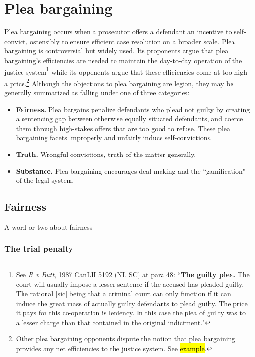 \section{Plea bargaining}

Plea bargaining occurs when a prosecutor offers a defendant an incentive to self-convict, ostensibly to ensure efficient case resolution on a broader scale. Plea bargaining is controversial but widely used. Its proponents argue that plea bargaining's efficiencies are needed to maintain the day-to-day operation of the justice system\footnote{See \textit{R v Butt}, 1987 CanLII 5192 (NL SC) at para 48: ``\textbf{The guilty plea.} The court will usually impose a lesser sentence if the accused has pleaded guilty. The rational [sic] being that a criminal court can only function if it can induce the great mass of actually guilty defendants to plead guilty. The price it pays for this co-operation is leniency. In this case the plea of guilty was to a lesser charge than that contained in the original indictment."} while its opponents argue that these efficiencies come at too high a price.\footnote{Other plea bargaining opponents dispute the notion that plea bargaining provides any net efficiencies to the justice system. See \hl{example}.} Although the objections to plea bargaining are legion, they may be generally summarized as falling under one of three categories:

\begin{itemize}
    \item \textbf{Fairness.} Plea bargains penalize defendants who plead not guilty by creating a sentencing gap between otherwise equally situated defendants, and coerce them through high-stakes offers that are too good to refuse. These plea bargaining facets improperly and unfairly induce self-convictions.
    \item \textbf{Truth.} Wrongful convictions, truth of the matter generally. 
    \item \textbf{Substance.} Plea bargaining encourages deal-making and the ``gamification" of the legal system. 
\end{itemize}



\subsection{Fairness}

A word or two about fairness

\subsubsection{The trial penalty}

